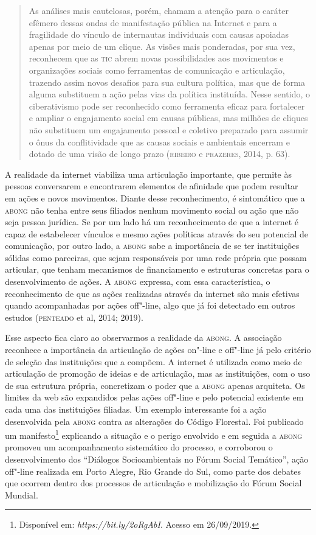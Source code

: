 \begin{quote}
As análises mais cautelosas, porém, chamam a atenção para o caráter
efêmero dessas ondas de manifestação pública na Internet e para a
fragilidade do vínculo de internautas individuais com causas apoiadas
apenas por meio de um clique. As visões mais ponderadas, por sua vez,
reconhecem que as \textsc{tic} abrem novas possibilidades aos movimentos e
organizações sociais como ferramentas de comunicação e articulação,
trazendo assim novos desafios para sua cultura política, mas que de
forma alguma substituem a ação pelas vias da política instituída. Nesse
sentido, o ciberativismo pode ser reconhecido como ferramenta eficaz
para fortalecer e ampliar o engajamento social em causas públicas, mas
milhões de cliques não substituem um engajamento pessoal e coletivo
preparado para assumir o ônus da conflitividade que as causas sociais e
ambientais encerram e dotado de uma visão de longo prazo (\textsc{ribeiro} e
\textsc{prazeres}, 2014, p. 63).
\end{quote}

A realidade da internet viabiliza uma articulação importante, que
permite às pessoas conversarem e encontrarem elementos de afinidade que
podem resultar em ações e novos movimentos. Diante desse reconhecimento,
é sintomático que a \textsc{abong} não tenha entre seus filiados nenhum movimento
social ou ação que não seja pessoa jurídica. Se por um lado há um
reconhecimento de que a internet é capaz de estabelecer vínculos e mesmo
ações políticas através do seu potencial de comunicação, por outro lado,
a \textsc{abong} sabe a importância de se ter instituições sólidas como
parceiras, que sejam responsáveis por uma rede própria que possam
articular, que tenham mecanismos de financiamento e estruturas concretas
para o desenvolvimento de ações. A \textsc{abong} expressa, com essa
característica, o reconhecimento de que as ações realizadas através da
internet são mais efetivas quando acompanhadas por ações off"-line, algo
que já foi detectado em outros estudos (\textsc{penteado} et al, 2014; 2019).

Esse aspecto fica claro ao observarmos a realidade da \textsc{abong}. A
associação reconhece a importância da articulação de ações on"-line e
off"-line já pelo critério de seleção das instituições que a compõem. A
internet é utilizada como meio de articulação de promoção de ideias e de
articulação, mas as instituições, com o uso de sua estrutura própria,
concretizam o poder que a \textsc{abong} apenas arquiteta. Os limites da web são
expandidos pelas ações off"-line e pelo potencial existente em cada uma
das instituições filiadas. Um exemplo interessante foi a ação
desenvolvida pela \textsc{abong} contra as alterações do Código Florestal. Foi
publicado um manifesto\footnote{Disponível em:
  \emph{https://bit.ly/2oRgAbI}.
  Acesso em 26/09/2019.} explicando a situação e o perigo envolvido e em
seguida a \textsc{abong} promoveu um acompanhamento sistemático do processo, e
corroborou o desenvolvimento dos ``Diálogos Socioambientais no Fórum
Social Temático'', ação off"-line realizada em Porto Alegre, Rio Grande
do Sul, como parte dos debates que ocorrem dentro dos processos de
articulação e mobilização do Fórum Social Mundial.

